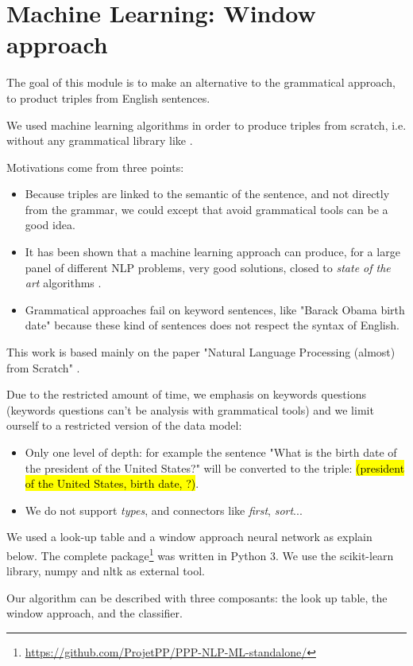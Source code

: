\section{Machine Learning: Window approach}

The goal of this module is to make an alternative to the grammatical approach, to product triples from English sentences.

We used machine learning algorithms in order to produce triples from scratch, i.e. without any grammatical library like \Stanford.


Motivations come from three points:
\begin{itemize}
\item Because triples are linked to the semantic of the sentence, and not directly from the grammar, we could except that avoid grammatical tools can be a good idea.
\item It has been shown that a machine learning approach can produce, for a large panel of different NLP problems, very good solutions, closed to \textit{state of the art} algorithms \cite{collobert}.
\item Grammatical approaches fail on keyword sentences, like "Barack Obama birth date" because these kind of sentences does not respect the syntax of English.
\end{itemize}

This work is based mainly on the paper "Natural Language Processing (almost) from Scratch" \cite{collobert}.

Due to the restricted amount of time, we emphasis on keywords questions (keywords questions can't be analysis with grammatical tools) and we limit ourself to a restricted version of the data model:
\begin{itemize}
\item Only one level of depth: for example the sentence "What is the birth date of the president of the United States?" will be converted to the triple: \hl{(president of the United States, birth date, ?)}. 
\item We do not support \textit{types}, and connectors like \textit{first}, \textit{sort}...
\end{itemize}
We used a look-up table and a window approach neural network as explain below. The complete package\footnote{\url{https://github.com/ProjetPP/PPP-NLP-ML-standalone/}} was written in Python 3. We use the scikit-learn library, numpy and nltk as external tool.

Our algorithm can be described with three composants: the look up table, the window approach, and the classifier.

